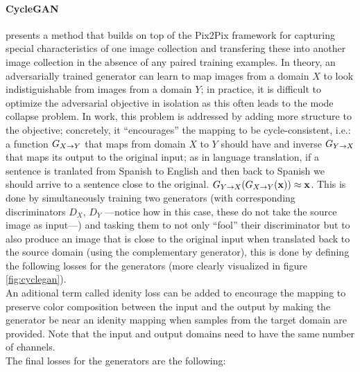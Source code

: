 \documentclass[../main.tex]{subfiles}
\begin{document}
\paragraph{CycleGAN}
\cite{Zhu2017a} presents a method that builds on top of the Pix2Pix framework
for capturing special characteristics of one
image collection and transfering these into another image collection in the
absence of any paired training examples.
In theory, an adversarially trained generator can learn to map images from
a domain $X$ to look indistiguishable from images from a domain $Y$; 
in practice, it is difficult to optimize the adversarial objective in isolation
as this often leads to the mode collapse problem.
In \cite{Zhu2017a} work, this problem is addressed by adding more structure to the
objective; concretely, it ``encourages'' the mapping to be cycle-consistent, i.e.:
a function $G_{X \rightarrow Y}$ that maps from domain $X$ to $Y$ should have and
inverse $G_{Y \rightarrow X}$ that maps its output to the original input; as in
language translation, if a sentence is tranlated from Spanish to English and
then back to Spanish we should arrive to a sentence close to the original.
$ G_{Y \rightarrow X}(G_{X \rightarrow Y}(\mathbf{x})) \approx \mathbf{x} $.
This is done by simultaneously training two generators (with corresponding
discriminators $D_X$, $D_Y$ ---notice how in this case, these do not take the
source image as input---) and tasking them to not only ``fool'' their
discriminator but to also produce an image that is close to the original input
when translated back to the source domain (using the complementary generator),
this is done by defining the following losses for the generators
(more clearly visualized in figure \ref{fig:cyclegan}).\\
An aditional term called
idenity loss can be added to encourage the mapping to preserve color composition
between the input and the output by making the generator be near an idenity
mapping when samples from the target domain are provided.
Note that the input and output domains need to have the same number of channels.\\ The final losses for the generators are the following:
\end{document}
